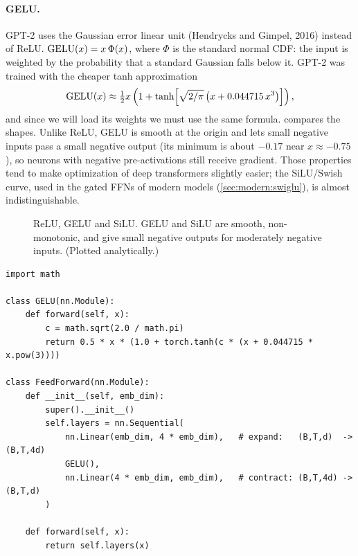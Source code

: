 \paragraph{GELU.}
GPT-2 uses the Gaussian error linear unit (Hendrycks and Gimpel, 2016) instead of ReLU.
$\operatorname{GELU}(x)=x\,\Phi(x)$, where $\Phi$ is the standard normal CDF: the input is weighted by the
probability that a standard Gaussian falls below it. GPT-2 was trained with the cheaper tanh
approximation
\begin{equation}
\operatorname{GELU}(x)\approx \tfrac12 x\left(1+\tanh\!\left[\sqrt{2/\pi}\,\big(x+0.044715\,x^3\big)\right]\right),
\label{eq:gpt:gelu}
\end{equation}
and since we will load its weights we must use the same formula.  compares the
shapes. Unlike ReLU, GELU is smooth at the origin and lets small negative inputs pass a small
negative output (its minimum is about $-0.17$ near $x\approx-0.75$), so neurons with negative
pre-activations still receive gradient. Those properties tend to make optimization of deep
transformers slightly easier; the SiLU/Swish curve, used in the gated FFNs of modern models
(\cref{sec:modern:swiglu}), is almost indistinguishable.

\begin{figure}[t]
\centering
{}
\caption{ReLU, GELU and SiLU. GELU and SiLU are smooth, non-monotonic, and give small negative
outputs for moderately negative inputs. (Plotted analytically.)}
\label{fig:gpt:gelu}
\end{figure}

\begin{lstlisting}[caption={GELU and the expand--contract feed-forward network.},label={lst:gpt:ffn}]
import math

class GELU(nn.Module):
    def forward(self, x):
        c = math.sqrt(2.0 / math.pi)
        return 0.5 * x * (1.0 + torch.tanh(c * (x + 0.044715 * x.pow(3))))

class FeedForward(nn.Module):
    def __init__(self, emb_dim):
        super().__init__()
        self.layers = nn.Sequential(
            nn.Linear(emb_dim, 4 * emb_dim),   # expand:   (B,T,d)  -> (B,T,4d)
            GELU(),
            nn.Linear(4 * emb_dim, emb_dim),   # contract: (B,T,4d) -> (B,T,d)
        )

    def forward(self, x):
        return self.layers(x)
\end{lstlisting}

